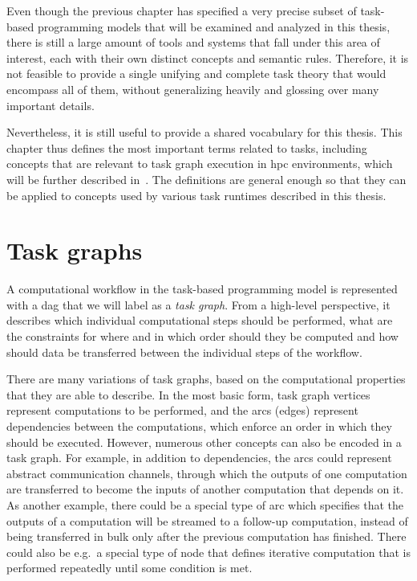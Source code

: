 Even though the previous chapter has specified a very precise subset of task-based programming
models that will be examined and analyzed in this thesis, there is still a large amount of tools
and systems that fall under this area of interest, each with their own distinct concepts and
semantic rules. Therefore, it is not feasible to provide a single unifying and complete task theory
that would encompass all of them, without generalizing heavily and glossing over many important
details.

Nevertheless, it is still useful to provide a shared vocabulary for this thesis. This chapter thus
defines the most important terms related to tasks, including concepts that are relevant to task
graph execution in \gls{hpc} environments, which will be further described
in~. The definitions are general enough so that they can be applied to
concepts used by various task runtimes described in this thesis.

\section{Task graphs}
A computational workflow in the task-based programming model is represented with a
\gls{dag} that we will label as a \emph{task graph}. From a high-level
perspective, it describes which individual computational steps should be performed, what are the
constraints for where and in which order should they be computed and how should data be transferred
between the individual steps of the workflow.

There are many variations of task graphs, based on the computational properties that they are able
to describe. In the most basic form, task graph vertices represent computations to be performed,
and the arcs (edges) represent dependencies between the computations, which enforce an order in
which they should be executed. However, numerous other concepts can also be encoded in a task
graph. For example, in addition to dependencies, the arcs could represent abstract communication
channels, through which the outputs of one computation are transferred to become the inputs of
another computation that depends on it. As another example, there could be a special type of arc
which specifies that the outputs of a computation will be streamed to a follow-up computation,
instead of being transferred in bulk only after the previous computation has finished. There could
also be e.g.\ a special type of node that defines iterative computation that is performed
repeatedly until some condition is met.

